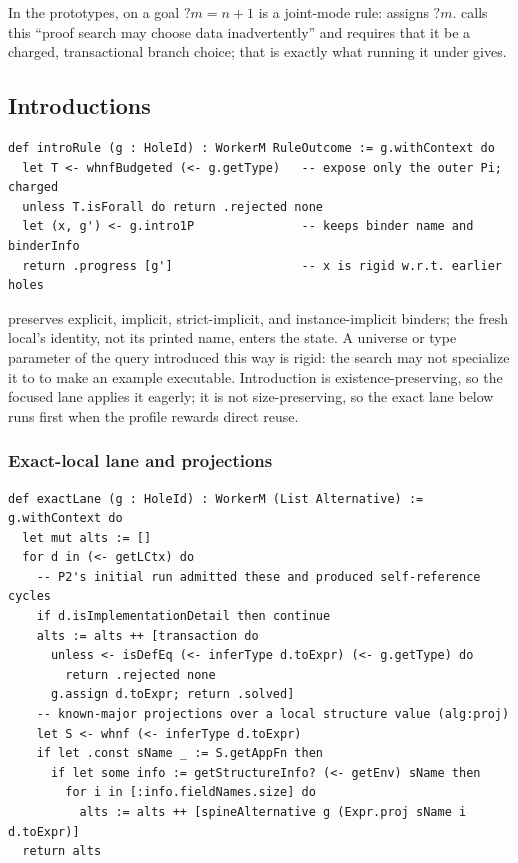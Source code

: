 In the prototypes,  on a goal $?m = n + 1$ is a joint-mode rule:  assigns $?m$.  calls this ``proof search may choose data inadvertently'' and requires that it be a charged, transactional branch choice; that is exactly what running it under  gives.

\subsection{Introductions}\label{alg:intro}

\begin{lstlisting}
def introRule (g : HoleId) : WorkerM RuleOutcome := g.withContext do
  let T <- whnfBudgeted (<- g.getType)   -- expose only the outer Pi; charged
  unless T.isForall do return .rejected none
  let (x, g') <- g.intro1P               -- keeps binder name and binderInfo
  return .progress [g']                  -- x is rigid w.r.t. earlier holes
\end{lstlisting}

 preserves explicit, implicit, strict-implicit, and instance-implicit binders; the fresh local's identity, not its printed name, enters the state. A universe or type parameter of the query introduced this way is rigid: the search may not specialize it to  to make an example executable. Introduction is existence-preserving, so the focused lane applies it eagerly; it is not size-preserving, so the exact lane below runs first when the profile rewards direct reuse.

\subsubsection{Exact-local lane and projections}

\begin{lstlisting}
def exactLane (g : HoleId) : WorkerM (List Alternative) := g.withContext do
  let mut alts := []
  for d in (<- getLCtx) do
    -- P2's initial run admitted these and produced self-reference cycles
    if d.isImplementationDetail then continue
    alts := alts ++ [transaction do
      unless <- isDefEq (<- inferType d.toExpr) (<- g.getType) do
        return .rejected none
      g.assign d.toExpr; return .solved]
    -- known-major projections over a local structure value (alg:proj)
    let S <- whnf (<- inferType d.toExpr)
    if let .const sName _ := S.getAppFn then
      if let some info := getStructureInfo? (<- getEnv) sName then
        for i in [:info.fieldNames.size] do
          alts := alts ++ [spineAlternative g (Expr.proj sName i d.toExpr)]
  return alts
\end{lstlisting}

